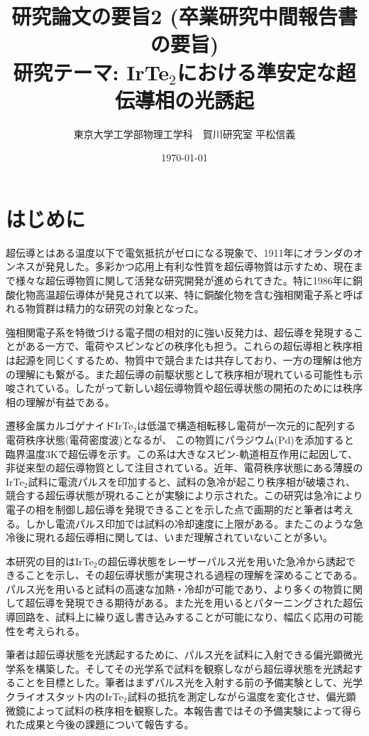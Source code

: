 \documentclass[11pt,a4paper]{jsarticle}
\title{研究論文の要旨2 (卒業研究中間報告書の要旨)\\研究テーマ: IrTe$_2$における準安定な超伝導相の光誘起}
\author{東京大学工学部物理工学科　賀川研究室 平松信義}
\date{\today}
\begin{document}
\maketitle
\thispagestyle{mypagestyle}


\section{はじめに}
超伝導とはある温度以下で電気抵抗がゼロになる現象で、1911年にオランダのオンネスが発見した。多彩かつ応用上有利な性質を超伝導物質は示すため、現在まで様々な超伝導物質に関して活発な研究開発が進められてきた。特に1986年に銅酸化物高温超伝導体が発見されて以来、特に銅酸化物を含む強相関電子系と呼ばれる物質群は精力的な研究の対象となった。

強相関電子系を特徴づける電子間の相対的に強い反発力は、超伝導を発現することがある一方で、電荷やスピンなどの秩序化も担う。これらの超伝導相と秩序相は起源を同じくするため、物質中で競合または共存\cite{Fausti,2D_SC}しており、一方の理解は他方の理解にも繋がる。また超伝導の前駆状態として秩序相が現れている可能性も示唆されている\cite{Valla1914}。したがって新しい超伝導物質や超伝導状態の開拓のためには秩序相の理解が有益である。

遷移金属カルゴゲナイドIrTe$_2$は低温で構造相転移し電荷が一次元的に配列する電荷秩序状態(電荷密度波)となるが、
この物質にパラジウム(Pd)を添加すると臨界温度3Kで超伝導を示す\cite{IrTe2Pd_SC}。この系は大きなスピン-軌道相互作用に起因して、非従来型の超伝導物質として注目されている。近年、電荷秩序状態にある薄膜のIrTe$_2$試料に電流パルスを印加すると、試料の急冷が起こり秩序相が破壊され、競合する超伝導状態が現れることが実験により示された\cite{SC_IrTe2}。この研究は急冷により電子の相を制御し超伝導を発現できることを示した点で画期的だと筆者は考える。しかし電流パルス印加では試料の冷却速度に上限がある。またこのような急冷後に現れる超伝導相に関しては、いまだ理解されていないことが多い。

本研究の目的はIrTe$_2$の超伝導状態をレーザーパルス光を用いた急冷から誘起できることを示し、その超伝導状態が実現される過程の理解を深めることである。パルス光を用いると試料の高速な加熱・冷却が可能であり、より多くの物質に関して超伝導を発現できる期待がある。また光を用いるとパターニングされた超伝導回路を、試料上に繰り返し書き込みすることが可能になり、幅広く応用の可能性を考えられる。

筆者は超伝導状態を光誘起するために、パルス光を試料に入射できる偏光顕微光学系を構築した。そしてその光学系で試料を観察しながら超伝導状態を光誘起することを目標とした。筆者はまずパルス光を入射する前の予備実験として、光学クライオスタット内のIrTe$_2$試料の抵抗を測定しながら温度を変化させ、偏光顕微鏡によって試料の秩序相を観察した。本報告書ではその予備実験によって得られた成果と今後の課題について報告する。
\end{document}
